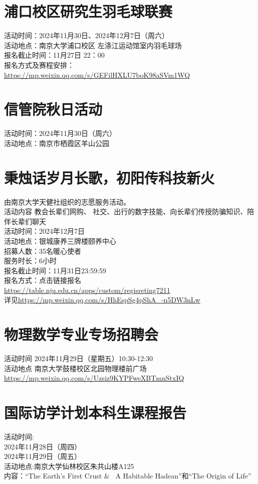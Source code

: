 \documentclass[letterpaper, 12pt]{article}
\begin{document}
\begin{multicols}{2}
\section{浦口校区研究生羽毛球联赛}
活动时间：2024年11月30日、2024年12月7日（周六）\\
活动地点：南京大学浦口校区 左涤江运动馆室内羽毛球场\\
报名截止时间：11月27日 22：00\\
报名方式及赛程安排：\url{https://mp.weixin.qq.com/s/GEFilHXLU7boK98aSVm1WQ}\\

\section{信管院秋日活动}
活动时间：2024年11月30日（周六）\\
活动地点：南京市栖霞区羊山公园\\

\section{秉烛话岁月长歌，初阳传科技新火}
由南京大学天健社组织的志愿服务活动。\\
活动内容 教会长辈们网购、 社交、出行的数字技能、向长辈们传授防骗知识、陪伴长辈们聊天\\
活动时间：2024年12月7日\\
活动地点：银城康养三牌楼颐养中心\\
招募人数：35名暖心使者\\
服务时长：6小时\\
报名截止时间：11月31日23:59:59\\
报名方式：点击链接报名 \\
\url{https://table.nju.edu.cn/apps/custom/regisreting7211}\\
详见\url{https://mp.weixin.qq.com/s/HhEspSg4pShA_-n5DW3nLw}

\section{物理数学专业专场招聘会}
活动时间 2024年11月29日（星期五）10:30-12:30\\
活动地点 南京大学鼓楼校区北园物理楼前广场\\
\url{https://mp.weixin.qq.com/s/Uzsiz9KYPFweXBTmnStxIQ}\\

\section{国际访学计划本科生课程报告}
活动时间:\\
2024年11月28日（周四）\\
2024年11月29日（周五）\\
活动地点:南京大学仙林校区朱共山楼A125\\
内容：“The Earth's First Crust \&  A Habitable Hadean”和“The Origin of Life”\\

\end{multicols}
\end{document}
